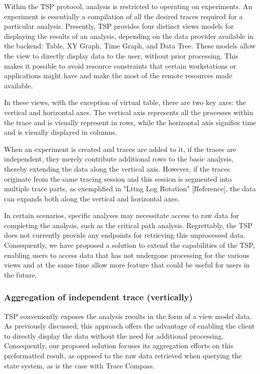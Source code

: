 Within the TSP protocol, analysis is restricted to operating on experiments. An experiment is essentially a compilation of all the desired traces required for a particular analysis. Presently, TSP provides four distinct views models for displaying the results of an analysis, depending on the data provider available in the backend: Table, XY Graph, Time Graph, and Data Tree. These models allow the view to directly display data to the user, without prior processing. This makes it possible to avoid resource constraints that certain workstations or applications might have and make the most of the remote resources made available.

In these views, with the exception of virtual table, there are two key axes: the vertical and horizontal axes. The vertical axis represents all the processes within the trace and is visually represent in rows, while the horizontal axis signifies time and is visually displayed in columns.

When an experiment is created and traces are added to it, if the traces are independent, they merely contribute additional rows to the basic analysis, thereby extending the data along the vertical axis. However, if the traces originate from the same tracing session and this session is segmented into multiple trace parts, as exemplified in "Lttng Log Rotation" [Reference], the data can expands both along the vertical and horizontal axes.

In certain scenarios, specific analyses may necessitate access to raw data for completing the analysis, such as the critical path analysis. Regrettably, the TSP does not currently provide any endpoints for retrieving this unprocessed data. Consequently, we have proposed a solution to extend the capabilities of the TSP, enabling users to access data that has not undergone processing for the various views and at the same time allow more feature that could be useful for users in the future.

\subsubsection{Aggregation of independent trace (vertically)}

TSP conveniently exposes the analysis results in the form of a view model data. As previously discussed, this approach offers the advantage of enabling the client to directly display the data without the need for additional processing. Consequently, our proposed solution focuses its aggregation efforts on this preformatted result, as opposed to the raw data retrieved when querying the state system, as is the case with Trace Compass.

